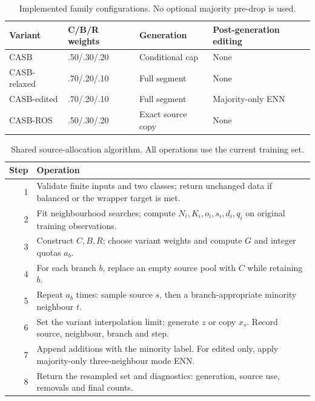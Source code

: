 \documentclass[conference]{IEEEtran}
\begin{document}
\begin{table}[!t]\centering\small\caption{Implemented family configurations. No optional majority pre-drop is used.}\label{tab:variants}
\begin{tabular}{llll}\toprule Variant & C/B/R weights & Generation & Post-generation editing\\\midrule
CASB & .50/.30/.20 & Conditional cap & None\\
CASB-relaxed & .70/.20/.10 & Full segment & None\\
CASB-edited & .70/.20/.10 & Full segment & Majority-only ENN\\
CASB-ROS & .50/.30/.20 & Exact source copy & None\\\bottomrule\end{tabular}\end{table}

\begin{table}[!t]\centering\small\caption{Shared source-allocation algorithm. All operations use the current training set.}\label{tab:algorithm}
\begin{tabularx}{\linewidth}{rX}\toprule Step & Operation\\\midrule
1 & Validate finite inputs and two classes; return unchanged data if balanced or the wrapper target is met.\\
2 & Fit neighbourhood searches; compute $N_i,K_i,o_i,s_i,d_i,q_i$ on original training observations.\\
3 & Construct $C,B,R$; choose variant weights and compute $G$ and integer quotas $a_b$.\\
4 & For each branch $b$, replace an empty source pool with $C$ while retaining $b$.\\
5 & Repeat $a_b$ times: sample source $s$, then a branch-appropriate minority neighbour $t$.\\
6 & Set the variant interpolation limit; generate $z$ or copy $x_s$. Record source, neighbour, branch and step.\\
7 & Append additions with the minority label. For edited only, apply majority-only three-neighbour mode ENN.\\
8 & Return the resampled set and diagnostics: generation, source use, removals and final counts.\\\bottomrule\end{tabularx}\end{table}
\end{document}
